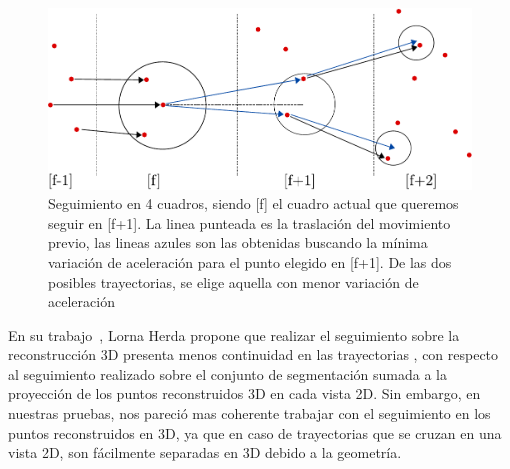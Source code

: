 \begin{figure}[hbt]
\begin{center}
\includegraphics[scale=0.8]{img/Tracking/tracking-eps-converted-to.pdf}
\end{center}
\caption{Seguimiento en 4 cuadros, siendo [f] el cuadro actual que queremos seguir en [f+1]. La linea punteada es la traslación del movimiento previo, las lineas azules son las obtenidas buscando la mínima variación de aceleración para el punto elegido en [f+1]. De las dos posibles trayectorias, se elige aquella con menor variación de aceleración}
\label{herda_00}
\end{figure}

En su trabajo~\cite{herda}, Lorna Herda propone que realizar el seguimiento sobre la reconstrucción 3D presenta menos continuidad en las trayectorias , con respecto al seguimiento realizado sobre el conjunto de segmentación sumada a la proyección de los puntos reconstruidos 3D en cada vista 2D. Sin embargo, en nuestras pruebas, nos pareció mas coherente trabajar con el seguimiento en los puntos reconstruidos en 3D, ya que en caso de trayectorias que se cruzan en una vista 2D, son fácilmente separadas en 3D debido a la geometría.
\\ 

